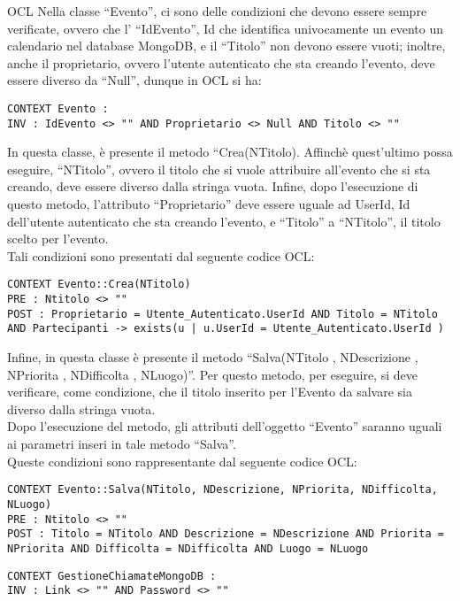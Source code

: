 \begin{listaPersonale}{OCL}
    Nella classe “Evento”, ci sono delle condizioni che devono essere sempre verificate, ovvero che l' “IdEvento”, Id che identifica univocamente un evento un calendario nel database MongoDB, e il “Titolo” non devono essere vuoti; inoltre, anche il proprietario, ovvero l'utente autenticato che sta creando l'evento, deve essere diverso da “Null”, dunque in OCL si ha:
    \begin{lstlisting}
CONTEXT Evento :
INV : IdEvento <> "" AND Proprietario <> Null AND Titolo <> ""
    \end{lstlisting}
    In questa classe, è presente il metodo “Crea(NTitolo). Affinchè quest'ultimo possa eseguire, “NTitolo”, ovvero il titolo che si vuole attribuire all'evento che si sta creando, deve essere diverso dalla stringa vuota. Infine, dopo l'esecuzione di questo metodo, l'attributo “Proprietario” deve essere uguale ad UserId, Id dell'utente autenticato che sta creando l'evento, e “Titolo” a “NTitolo”, il titolo scelto per l'evento. \\
    Tali condizioni sono presentati dal seguente codice OCL:
    \begin{lstlisting}
CONTEXT Evento::Crea(NTitolo)
PRE : Ntitolo <> ""
POST : Proprietario = Utente_Autenticato.UserId AND Titolo = NTitolo AND Partecipanti -> exists(u | u.UserId = Utente_Autenticato.UserId )
    \end{lstlisting}
    Infine, in questa classe è presente il metodo “Salva(NTitolo , NDescrizione , NPriorita , NDifficolta , NLuogo)”. Per questo metodo, per eseguire, si deve verificare, come condizione, che il titolo inserito per l'Evento da salvare sia diverso dalla stringa vuota. \\
    Dopo l'esecuzione del metodo, gli attributi dell'oggetto “Evento” saranno uguali ai parametri inseri in tale metodo “Salva”. \\
    Queste condizioni sono rappresentante dal seguente codice OCL:

    \begin{lstlisting}
CONTEXT Evento::Salva(NTitolo, NDescrizione, NPriorita, NDifficolta, NLuogo)
PRE : Ntitolo <> ""
POST : Titolo = NTitolo AND Descrizione = NDescrizione AND Priorita = NPriorita AND Difficolta = NDifficolta AND Luogo = NLuogo 
    \end{lstlisting}




    \begin{lstlisting}
CONTEXT GestioneChiamateMongoDB :
INV : Link <> "" AND Password <> "" 
    \end{lstlisting}





\end{listaPersonale}
